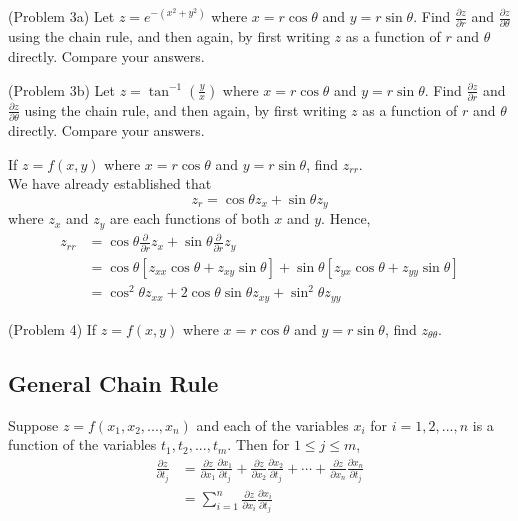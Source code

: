\documentclass[handout]{ximera}
\begin{document}
\begin{problem}(Problem 3a)
Let $z = e^{-(x^2 + y^2)}$ where $x = r\cos \theta$ and $y = r\sin \theta$.  
Find $\frac{\partial z}{\partial r}$ and $\frac{\partial z}{\partial \theta}$ using the chain rule, 
and then again, by first writing $z$ as a function of $r$ and $\theta$ directly. Compare your answers.
\end{problem}

\begin{problem}(Problem 3b)
Let $z = \tan^{-1}\left(\frac{y}{x}\right)$ where $x = r\cos \theta$ and $y = r\sin \theta$.  
Find $\frac{\partial z}{\partial r}$ and $\frac{\partial z}{\partial \theta}$ using the chain rule, and then again, 
by first writing $z$ as a function of $r$ and $\theta$ directly.
Compare your answers.
\end{problem}


\begin{example}[Example 4]
If $z = f(x,y)$ where $x = r\cos \theta$ and $y = r \sin \theta$, find $z_{rr}$.\\
We have already established that
\[
z_r = \cos \theta z_x + \sin \theta z_y
\]
where $z_x$ and $z_y$ are each functions of both $x$ and $y$. Hence,
\begin{align*}
z_{rr} &= \cos \theta \frac{\partial}{\partial r} z_x + \sin \theta \frac{\partial}{\partial r} z_y\\
       &= \cos \theta \left[z_{xx}\cos \theta + z_{xy} \sin \theta \right] + 
       \sin \theta \left[ z_{yx} \cos \theta + z_{yy} \sin \theta  \right]\\
       &= \cos^2 \theta z_{xx} + 2\cos \theta \sin \theta z_{xy} + \sin^2 \theta z_{yy}
\end{align*}
\end{example}

\begin{problem}(Problem 4) 
If $z = f(x,y)$ where $x = r\cos \theta$ and $y = r \sin \theta$, find $z_{\theta \theta}$.
\end{problem}
       
\subsection{General Chain Rule}
Suppose $z = f(x_1, x_2, ..., x_n)$ and each of the variables $x_i$ for $i = 1, 2, ..., n$ is a function of the variables
$t_1, t_2,..., t_m$. Then for $1 \leq j \leq m$,
\begin{align*}
\frac{\partial z}{\partial t_j} &= \frac{\partial z}{\partial x_1}\frac{\partial x_1}{\partial t_j} 
                     + \frac{\partial z}{\partial x_2}\frac{\partial x_2}{\partial t_j} + \cdots + \frac{\partial z}{\partial x_n}\frac{\partial x_n}{\partial t_j}\\
                               &= \sum_{i = 1}^n \frac{\partial z}{\partial x_i}\frac{\partial x_i}{\partial t_j}
\end{align*}
\end{document}
